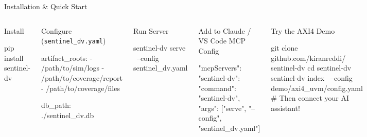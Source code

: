 \documentclass[aspectratio=169,t]{beamer}
\begin{document}
\begin{frame}[fragile]{Installation \& Quick Start}
  \begin{columns}[T]
      \begin{block}{Install}
\begin{semiverbatim}\color{white}
pip install sentinel-dv
\end{semiverbatim}
      \end{block}
      \vspace{0.3em}
      \begin{block}{Configure (\texttt{sentinel\_dv.yaml})}
\begin{semiverbatim}\color{white}
artifact_roots:
  - /path/to/sim/logs
  - /path/to/coverage/report
  - /path/to/coverage/files

db_path: ./sentinel_dv.db
\end{semiverbatim}
      \end{block}
      \vspace{0.3em}
      \begin{block}{Run Server}
\begin{semiverbatim}\color{white}
sentinel-dv serve \
  --config sentinel_dv.yaml
\end{semiverbatim}
      \end{block}

      \begin{block}{Add to Claude / VS Code MCP Config}
\begin{semiverbatim}\color{white}
{
  "mcpServers": {
    "sentinel-dv": {
      "command": "sentinel-dv",
      "args": ["serve",
        "--config", "sentinel_dv.yaml"]
    }
  }
}
\end{semiverbatim}
      \end{block}
      \vspace{0.3em}
      \begin{exampleblock}{Try the AXI4 Demo}
\begin{semiverbatim}\color{white}
git clone github.com/kiranreddi/
  sentinel-dv
cd sentinel-dv
sentinel-dv index \
  --config demo/axi4_uvm/config.yaml
# Then connect your AI assistant!
\end{semiverbatim}
      \end{exampleblock}
  \end{columns}
\end{frame}

\end{document}
